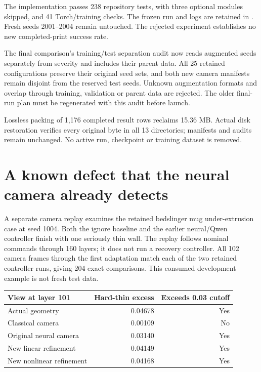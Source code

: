 \documentclass[10pt,letterpaper]{article}
\newcommand{\code}[1]{\texttt{\detokenize{#1}}}
\begin{document}
The implementation passes 238 repository tests, with three optional modules
skipped, and 41 Torch/training checks. The frozen run and logs are retained in
\code{neural-recovery:native-coverage-v58}. Fresh seeds 2001--2004 remain untouched.
The rejected experiment establishes no new completed-print success rate.

The final comparison's training/test separation audit now reads augmented seeds
separately from severity and includes their parent data. All 25 retained
configurations preserve their original seed sets, and both new camera manifests
remain disjoint from the reserved test seeds. Unknown augmentation formats and
overlap through training, validation or parent data are rejected. The older
final-run plan must be regenerated with this audit before launch.

Lossless packing of 1,176 completed result rows reclaims 15.36 MB. Actual disk
restoration verifies every original byte in all 13 directories; manifests and
audits remain unchanged. No active run, checkpoint or training dataset is removed.

\clearpage
\section{A known defect that the neural camera already detects}
A separate camera replay examines the retained bedslinger mug under-extrusion
case at seed 1004. Both the ignore baseline and the earlier neural/Qwen controller
finish with one seriously thin wall. The replay follows nominal commands through
160 layers; it does not run a recovery controller. All 102 camera frames through
the first adaptation match each of the two retained controller runs, giving 204
exact comparisons. This consumed development example is not fresh test data.

\begin{center}
\begin{tabular}{lrr}
\toprule
View at layer 101 & Hard-thin excess & Exceeds 0.03 cutoff\\
\midrule
Actual geometry & 0.04678 & Yes\\
Classical camera & 0.00109 & No\\
Original neural camera & 0.03140 & Yes\\
New linear refinement & 0.04149 & Yes\\
New nonlinear refinement & 0.04168 & Yes\\
\bottomrule
\end{tabular}
\end{center}
\end{document}
